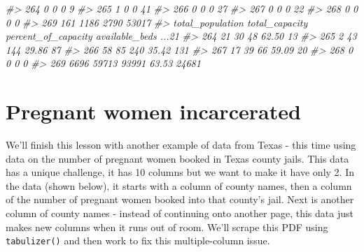 \documentclass[
]{krantz}
\makeatletter
\newenvironment{Shaded}{\begin{snugshade}}{\end{snugshade}}
\newcommand{\CommentTok}[1]{\textcolor[rgb]{0.37,0.37,0.37}{\textit{#1}}}
\newenvironment{kframe}{%
\medskip{}
\setlength{\fboxsep}{.8em}
 \def\at@end@of@kframe{}%
 \ifinner\ifhmode%
  \def\at@end@of@kframe{\end{minipage}}%
  \begin{minipage}{\columnwidth}%
 \fi\fi%
 \def\FrameCommand##1{\hskip\@totalleftmargin \hskip-\fboxsep
 \colorbox{shadecolor}{##1}\hskip-\fboxsep
     \hskip-\linewidth \hskip-\@totalleftmargin \hskip\columnwidth}%
 \MakeFramed {\advance\hsize-\width
   \@totalleftmargin\z@ \linewidth\hsize
   \@setminipage}}%
 {\par\unskip\endMakeFramed%
 \at@end@of@kframe}
\renewenvironment{Shaded}{\begin{kframe}}{\end{kframe}}
\makeatother
\begin{document}
\begin{Shaded}
\begin{Highlighting}[]
\CommentTok{\#\textgreater{} 264                               0            0           0              9}
\CommentTok{\#\textgreater{} 265                               1            0           0             41}
\CommentTok{\#\textgreater{} 266                               0            0           0             27}
\CommentTok{\#\textgreater{} 267                               0            0           0             22}
\CommentTok{\#\textgreater{} 268                               0            0           0              0}
\CommentTok{\#\textgreater{} 269                             161         1186        2790          53017}
\CommentTok{\#\textgreater{}     total\_population total\_capacity percent\_of\_capacity available\_beds ...21}
\CommentTok{\#\textgreater{} 264               21             30                  48          62.50    13}
\CommentTok{\#\textgreater{} 265                2             43                 144          29.86    87}
\CommentTok{\#\textgreater{} 266               58             85                 240          35.42   131}
\CommentTok{\#\textgreater{} 267               17             39                  66          59.09    20}
\CommentTok{\#\textgreater{} 268                0              0                   0                    0}
\CommentTok{\#\textgreater{} 269             6696          59713               93991          63.53 24681}
\end{Highlighting}
\end{Shaded}

\hypertarget{pregnant-women-incarcerated}{%
\section{Pregnant women incarcerated}\label{pregnant-women-incarcerated}}

We'll finish this lesson with another example of data from Texas - this time using data on the number of pregnant women booked in Texas county jails. This data has a unique challenge, it has 10 columns but we want to make it have only 2. In the data (shown below), it starts with a column of county names, then a column of the number of pregnant women booked into that county's jail. Next is another column of county names - instead of continuing onto another page, this data just makes new columns when it runs out of room. We'll scrape this PDF using \texttt{tabulizer()} and then work to fix this multiple-column issue.
\end{document}
